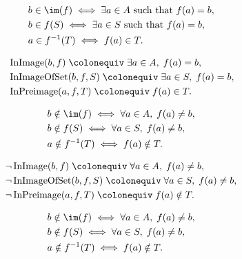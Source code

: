 \begin{remark*}
\[
\begin{aligned}
&b \in \im(f)
\;\Longleftrightarrow\;
\exists a \in A \text{ such that } f(a) = b, \\
&b \in f(S)
\;\Longleftrightarrow\;
\exists a \in S \text{ such that } f(a) = b, \\
&a \in f^{-1}(T)
\;\Longleftrightarrow\;
f(a) \in T.
\end{aligned}
\]
\end{remark*}

\begin{remark*}
\[
\begin{aligned}
&\operatorname{InImage}(b,f)
\;\colonequiv\;
\exists a \in A,\; f(a) = b, \\
&\operatorname{InImageOfSet}(b,f,S)
\;\colonequiv\;
\exists a \in S,\; f(a) = b, \\
&\operatorname{InPreimage}(a,f,T)
\;\colonequiv\;
f(a) \in T.
\end{aligned}
\]
\end{remark*}

\begin{remark*}
\[
\begin{aligned}
&b \notin \im(f)
\;\Longleftrightarrow\;
\forall a \in A,\; f(a) \ne b, \\
&b \notin f(S)
\;\Longleftrightarrow\;
\forall a \in S,\; f(a) \ne b, \\
&a \notin f^{-1}(T)
\;\Longleftrightarrow\;
f(a) \notin T.
\end{aligned}
\]
\end{remark*}

\begin{remark*}
\[
\begin{aligned}
&\neg \operatorname{InImage}(b,f)
\;\colonequiv\;
\forall a \in A,\; f(a) \ne b, \\
&\neg \operatorname{InImageOfSet}(b,f,S)
\;\colonequiv\;
\forall a \in S,\; f(a) \ne b, \\
&\neg \operatorname{InPreimage}(a,f,T)
\;\colonequiv\;
f(a) \notin T.
\end{aligned}
\]
\end{remark*}

\begin{remark*}
\[
\begin{aligned}
&b \notin \im(f)
\;\Longleftrightarrow\;
\forall a \in A,\; f(a) \ne b, \\
&b \notin f(S)
\;\Longleftrightarrow\;
\forall a \in S,\; f(a) \ne b, \\
&a \notin f^{-1}(T)
\;\Longleftrightarrow\;
f(a) \notin T.
\end{aligned}
\]
\end{remark*}

